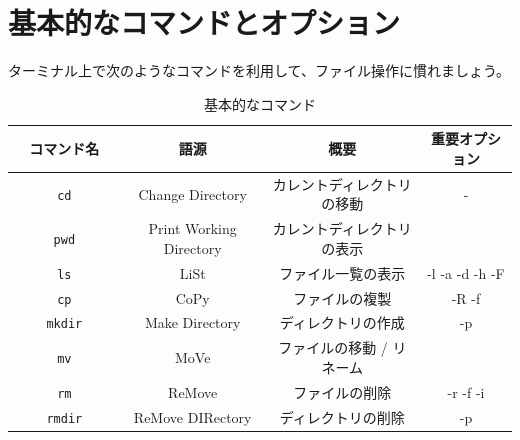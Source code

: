 \documentclass[a4j]{ltjreport}
\begin{document}
    \section{基本的なコマンドとオプション}
    ターミナル上で次のようなコマンドを利用して、ファイル操作に慣れましょう。
    \begin{table}[htbp]
        \centering
        \caption{基本的なコマンド}
        \label{tab:command}
        \begin{tabular}{cccc}
            \hline
            \hline
            コマンド名　　　& 語源                     & 概要                       &  重要オプション \\
            \hline
            \texttt{cd}    &  Change Directory        & カレントディレクトリの移動 & - \\
            \texttt{pwd}   &  Print Working Directory & カレントディレクトリの表示 & \\
            \texttt{ls}    &  LiSt                    & ファイル一覧の表示         &	   -l -a -d -h -F \\
            \texttt{cp}    &  CoPy                    & ファイルの複製             &	      -R -f \\
            \texttt{mkdir} &  Make Directory          & ディレクトリの作成         &	      -p \\
            \texttt{mv}    &  MoVe                    & ファイルの移動 / リネーム  & \\
            \texttt{rm}    &  ReMove                  & ファイルの削除             &	      -r -f -i \\
            \texttt{rmdir} &  ReMove DIRectory        & ディレクトリの削除         &	      -p \\
            \hline
            \hline
        \end{tabular}
    \end{table}
\end{document}
